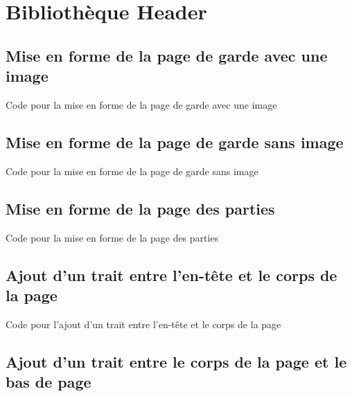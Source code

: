 \chapter{Bibliothèque Header}

\section{Mise en forme de la page de garde avec une image}

\begin{Latex}{Code pour la mise en forme de la page de garde avec une image}
\end{Latex}


\section{Mise en forme de la page de garde sans image}

\begin{Latex}{Code pour la mise en forme de la page de garde sans image}
\end{Latex}

\section{Mise en forme de la page des parties}

\begin{Latex}{Code pour la mise en forme de la page des parties}
\end{Latex}

\section{Ajout d'un trait entre l'en-tête et le corps de la page}

\begin{Latex}{Code pour l'ajout d'un trait entre l'en-tête et le corps de la page}
\end{Latex}

\section{Ajout d'un trait entre le corps de la page et le bas de page}

